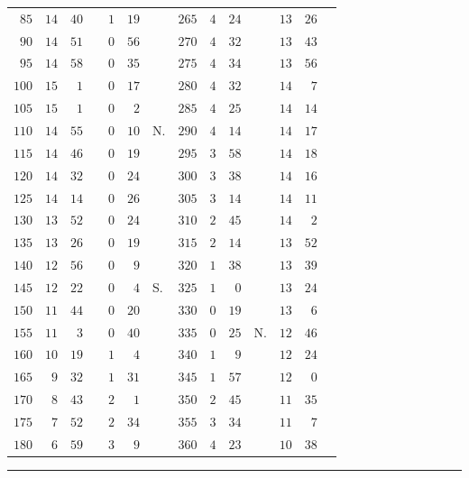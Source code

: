 \begin{center}
\begin{tabular}{r|rrl|rrl||r|rrl|rrl}
$85$&$14$&$40$&&$1$&$19$&&$265$&$4$&$24$&&$13$&$26$&\\
$90$&$14$&$51$&&$0$&$56$&&$270$&$4$&$32$&&$13$&$43$&\\[3pt]
$95$&$14$&$58$&&$0$&$35$&&$275$&$4$&$34$&&$13$&$56$&\\
$100$&$15$&$1$&&$0$&$17$&&$280$&$4$&$32$&&$14$&$7$&\\
$105$&$15$&$1$&&$0$&$2$&&$285$&$4$&$25$&&$14$&$14$&\\
$110$&$14$&$55$&&$0$&$10$&N.&$290$&$4$&$14$&&$14$&$17$&\\
$115$&$14$&$46$&&$0$&$19$&&$295$&$3$&$58$&&$14$&$18$&\\
$120$&$14$&$32$&&$0$&$24$&&$300$&$3$&$38$&&$14$&$16$&\\[3pt]
$125$&$14$&$14$&&$0$&$26$&&$305$&$3$&$14$&&$14$&$11$&\\
$130$&$13$&$52$&&$0$&$24$&&$310$&$2$&$45$&&$14$&$2$&\\
$135$&$13$&$26$&&$0$&$19$&&$315$&$2$&$14$&&$13$&$52$&\\
$140$&$12$&$56$&&$0$&$9$&&$320$&$1$&$38$&&$13$&$39$&\\
$145$&$12$&$22$&&$0$&$4$&S.&$325$&$1$&$0$&&$13$&$24$&\\
$150$&$11$&$44$&&$0$&$20$&&$330$&$0$&$19$&&$13$&$6$&\\[3pt]
$155$&$11$&$3$&&$0$&$40$&&$335$&$0$&$25$&N.&$12$&$46$&\\
$160$&$10$&$19$&&$1$&$4$&&$340$&$1$&$9$&&$12$&$24$&\\
$165$&$9$&$32$&&$1$&$31$&&$345$&$1$&$57$&&$12$&$0$&\\
$170$&$8$&$43$&&$2$&$1$&&$350$&$2$&$45$&&$11$&$35$&\\
$175$&$7$&$52$&&$2$&$34$&&$355$&$3$&$34$&&$11$&$7$&\\
$180$&$6$&$59$&&$3$&$9$&&$360$&$4$&$23$&&$10$&$38$&\\
\end{tabular}
\endgroup
\end{center}
\begin{center}\rule{.25\linewidth}{.4pt}\end{center}
\clearpage
\thispagestyle{empty}
\noindent{}\null\par
\clearpage
